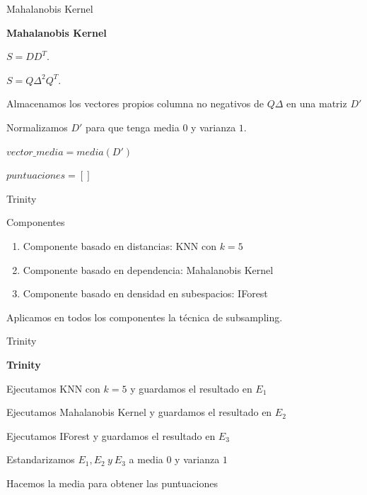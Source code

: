 \documentclass[10pt]{beamer}
\begin{document}
\begin{frame}[fragile]{Mahalanobis Kernel}
\vspace{10px}
\pause
{}

\begin{algorithm}[H]{\textbf{Mahalanobis Kernel}}
	
	$S = DD^T$.
	
	$S = Q\Delta^2 Q^T$.
	
	Almacenamos los vectores propios columna no negativos de $Q\Delta$ en una matriz $D'$
	
	Normalizamos $D'$ para que tenga media $0$ y varianza $1$.
	
	$vector\_media = media(D')$
	
	$puntuaciones = []$
	
\end{algorithm}

\end{frame}

\begin{frame}[fragile]{Trinity}
\vspace{10px}
\pause
{}


\begin{block}{Componentes}
	\begin{enumerate}
		\item Componente basado en distancias: KNN con $k=5$
		\pause
		\item Componente basado en dependencia: Mahalanobis Kernel
		\pause
		\item Componente basado en densidad en subespacios: IForest
	\end{enumerate}
\end{block}

\begin{alertblock}
	Aplicamos en todos los componentes la técnica de subsampling.
\end{alertblock}

\end{frame}

\begin{frame}[fragile]{Trinity}
\vspace{10px}
\pause
{}

\begin{algorithm}[H]{\textbf{Trinity}}
	
	Ejecutamos KNN con $k=5$ y guardamos el resultado en $E_1$
	
	Ejecutamos Mahalanobis Kernel y guardamos el resultado en $E_2$
	
	Ejecutamos IForest y guardamos el resultado en $E_3$
	
	Estandarizamos $E_1 , E_2 \ y \ E_3$ a media $0$ y varianza $1$
	
	Hacemos la media para obtener las puntuaciones
	
\end{algorithm}

\end{frame}
\end{document}

